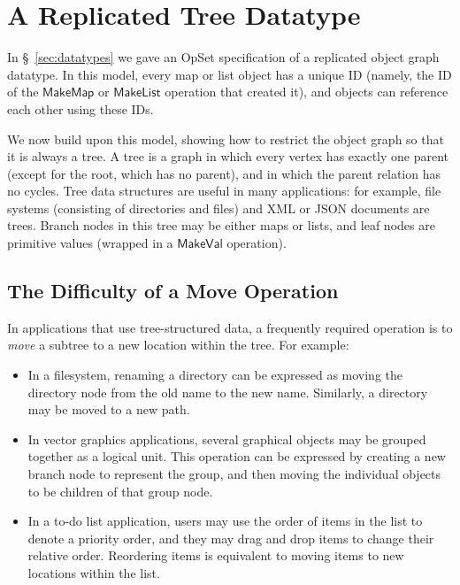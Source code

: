 \section{A Replicated Tree Datatype}\label{sec:tree}

In \S~\ref{sec:datatypes} we gave an OpSet specification of a replicated object graph datatype.
In this model, every map or list object has a unique ID (namely, the ID of the $\mathsf{MakeMap}$ or $\mathsf{MakeList}$ operation that created it), and objects can reference each other using these IDs.

We now build upon this model, showing how to restrict the object graph so that it is always a tree.
A tree is a graph in which every vertex has exactly one parent (except for the root, which has no parent), and in which the parent relation has no cycles.
Tree data structures are useful in many applications: for example, file systems (consisting of directories and files) and XML or JSON documents are trees.
Branch nodes in this tree may be either maps or lists, and leaf nodes are primitive values (wrapped in a $\mathsf{MakeVal}$ operation).

\subsection{The Difficulty of a Move Operation}\label{sec:tree-difficult}

In applications that use tree-structured data, a frequently required operation is to \emph{move} a subtree to a new location within the tree.
For example:
\begin{itemize}
    \item In a filesystem, renaming a directory can be expressed as moving the directory node from the old name to the new name.
        Similarly, a directory may be moved to a new path.
    \item In vector graphics applications, several graphical objects may be grouped together as a logical unit.
        This operation can be expressed by creating a new branch node to represent the group, and then moving the individual objects to be children of that group node.
    \item In a to-do list application, users may use the order of items in the list to denote a priority order, and they may drag and drop items to change their relative order.
        Reordering items is equivalent to moving items to new locations within the list.
\end{itemize}

